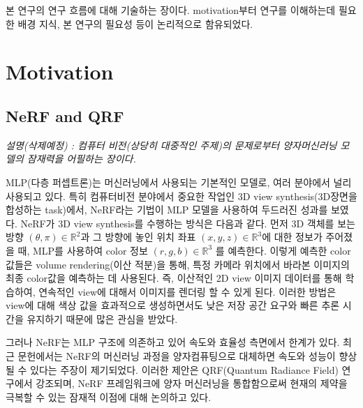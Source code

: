 \newtheorem{definition}{Definition}[section]
본 연구의 연구 흐름에 대해 기술하는 장이다. motivation부터 연구를 이해하는데 필요한 배경 지식, 본 연구의 필요성 등이 논리적으로 함유되었다.
\section{Motivation}
\subsection{NeRF and QRF}
\textit{설명(삭제예정) : 컴퓨터 비전(상당히 대중적인 주제)의 문제로부터 양자머신러닝 모델의 잠재력을 어필하는 장이다.}


MLP(다층 퍼셉트론)는 머신러닝에서 사용되는 기본적인 모델로, 여러 분야에서 널리 사용되고 있다. 특히 컴퓨터비전 분야에서 중요한 작업인 3D view synthesis(3D장면을 합성하는 task)에서, NeRF라는 기법이 MLP 모델을 사용하여 두드러진 성과를 보였다. NeRF가 3D view synthesis를 수행하는 방식은 다음과 같다. 먼저 3D 객체를 보는 방향 \( (\theta, \pi)  \in \mathbb{R}^2\)과 그 방향에 놓인 위치 좌표 $(x,y,z) \in \mathbb{R}^3$에 대한 정보가 주어졌을 때, MLP를 사용하여 $\text{color 정보 }(r,g,b) \in \mathbb{R}^3$ 를 예측한다. 이렇게 예측한 color값들은 volume rendering(이산 적분)을 통해, 특정 카메라 위치에서 바라본 이미지의 최종 color값을 예측하는 데 사용된다. 즉, 이산적인 2D view 이미지 데이터를 통해 학습하여, 연속적인 view에 대해서 이미지를 렌더링 할 수 있게 된다. 이러한 방법은 view에 대해 색상 값을 효과적으로 생성하면서도 낮은 저장 공간 요구와 빠른 추론 시간을 유지하기 때문에 많은 관심을 받았다.

 그러나 NeRF는 MLP 구조에 의존하고 있어 속도와 효율성 측면에서 한계가 있다. 최근 문헌에서는 NeRF의 머신러닝 과정을 양자컴퓨팅으로 대체하면 속도와 성능이 향상될 수 있다는 주장이 제기되었다. 이러한 제안은 QRF(Quantum Radiance Field) 연구에서 강조되며, NeRF 프레임워크에 양자 머신러닝을 통합함으로써 현재의 제약을 극복할 수 있는 잠재적 이점에 대해 논의하고 있다.

